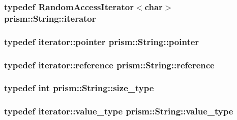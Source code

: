 \subsubsection[{\texorpdfstring{iterator}{iterator}}]{\setlength{\rightskip}{0pt plus 5cm}typedef Random\+Access\+Iterator$<$char$>$ {\bf prism\+::\+String\+::iterator}}\hypertarget{classprism_1_1_string_adacc7975837e5fff95d70690777fb330}{}\label{classprism_1_1_string_adacc7975837e5fff95d70690777fb330}
\subsubsection[{\texorpdfstring{pointer}{pointer}}]{\setlength{\rightskip}{0pt plus 5cm}typedef iterator\+::pointer {\bf prism\+::\+String\+::pointer}}\hypertarget{classprism_1_1_string_ac7944d9212ad675ba05280657ce14d12}{}\label{classprism_1_1_string_ac7944d9212ad675ba05280657ce14d12}
\subsubsection[{\texorpdfstring{reference}{reference}}]{\setlength{\rightskip}{0pt plus 5cm}typedef iterator\+::reference {\bf prism\+::\+String\+::reference}}\hypertarget{classprism_1_1_string_a0abe551090035c27a0f80ea403199727}{}\label{classprism_1_1_string_a0abe551090035c27a0f80ea403199727}
\subsubsection[{\texorpdfstring{size\+\_\+type}{size_type}}]{\setlength{\rightskip}{0pt plus 5cm}typedef int {\bf prism\+::\+String\+::size\+\_\+type}}\hypertarget{classprism_1_1_string_a33d0fff8e7a3f85f43487c6975e3e766}{}\label{classprism_1_1_string_a33d0fff8e7a3f85f43487c6975e3e766}
\subsubsection[{\texorpdfstring{value\+\_\+type}{value_type}}]{\setlength{\rightskip}{0pt plus 5cm}typedef iterator\+::value\+\_\+type {\bf prism\+::\+String\+::value\+\_\+type}}\hypertarget{classprism_1_1_string_a9808c1cb8dbe4ec046174c3318e577b7}{}\label{classprism_1_1_string_a9808c1cb8dbe4ec046174c3318e577b7}


